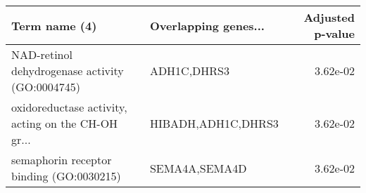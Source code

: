 \begin{tabular}{llr}
\toprule
                                     Term name (4) & Overlapping genes... &  Adjusted p-value \\
\midrule
   NAD-retinol dehydrogenase activity (GO:0004745) &          ADH1C,DHRS3 &          3.62e-02 \\
oxidoreductase activity, acting on the CH-OH gr... &   HIBADH,ADH1C,DHRS3 &          3.62e-02 \\
          semaphorin receptor binding (GO:0030215) &        SEMA4A,SEMA4D &          3.62e-02 \\
\bottomrule
\end{tabular}
